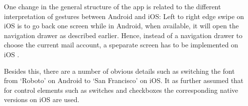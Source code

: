 \documentclass[a4paper,11pt,twoside]{article}
\begin{document}
One change in the general structure of the app is related to the different
interpretation of gestures between Android and iOS: Left to right edge swipe
on iOS is to go back one screen while in Android, when available, it will open
the navigation drawer as described earlier. Hence, instead of a navigation drawer
to choose the current mail account, a speparate screen has to be implemented
on iOS \cite{adapt_ios}.

Besides this, there are a number of obvious details such as switching the font
from `Roboto' on Android to `San Francisco' on iOS. It as further assumed that
for control elements such as switches and checkboxes the corresponding native
versions on iOS are used.






\end{document}
